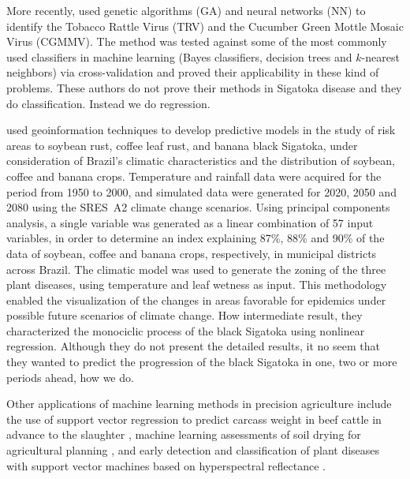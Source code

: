 More recently, \citet{Glezakos2010} used genetic algorithms (GA) and
neural networks (NN) to identify the Tobacco Rattle Virus (TRV) and
the Cucumber Green Mottle Mosaic Virus (CGMMV).
%
The method was tested against some of the most commonly used
classifiers in machine learning (Bayes classifiers, decision trees and
$k$-nearest neighbors) via cross-validation and proved their
applicability in these kind of problems.
%
These authors do not prove their methods in Sigatoka disease and they do classification. Instead we do regression.

\citet{Alves2011} used geoinformation techniques to
develop predictive models in the study of risk areas to soybean rust,
coffee leaf rust, and banana black Sigatoka, under consideration of
Brazil’s climatic characteristics and the distribution of soybean,
coffee and banana crops.
%
Temperature and rainfall data were acquired for the period from 1950
to 2000, and simulated data were generated for 2020, 2050 and 2080
using the SRES~A2 climate change scenarios.
%
Using principal components analysis, a single variable was generated
as a linear combination of 57 input variables, in order to determine
an index explaining 87\%, 88\% and 90\% of the data
%
%
of soybean, coffee and
banana crops, respectively, in municipal districts across Brazil.
%
The climatic model was used to generate the zoning of the three plant
diseases, using temperature and leaf wetness as input.
%
%
This methodology enabled the visualization of the changes in areas
favorable for epidemics under possible future scenarios of climate
change.
%
How intermediate result, they characterized the monociclic process of the black Sigatoka using  nonlinear regression. Although they do not present the detailed results, it no seem that they wanted to predict the progression of the black Sigatoka in one, two or more periods ahead, how we do.

Other applications of machine learning methods in precision
agriculture include the use of support vector regression to predict
carcass weight in beef cattle in advance to the slaughter
\citep{Alonso2013}, machine learning assessments of soil drying for
agricultural planning \citep{Coopersmith2014}, and early detection and
classification of plant diseases with support vector machines based on
hyperspectral reflectance \citep{Rumpf2010}.

